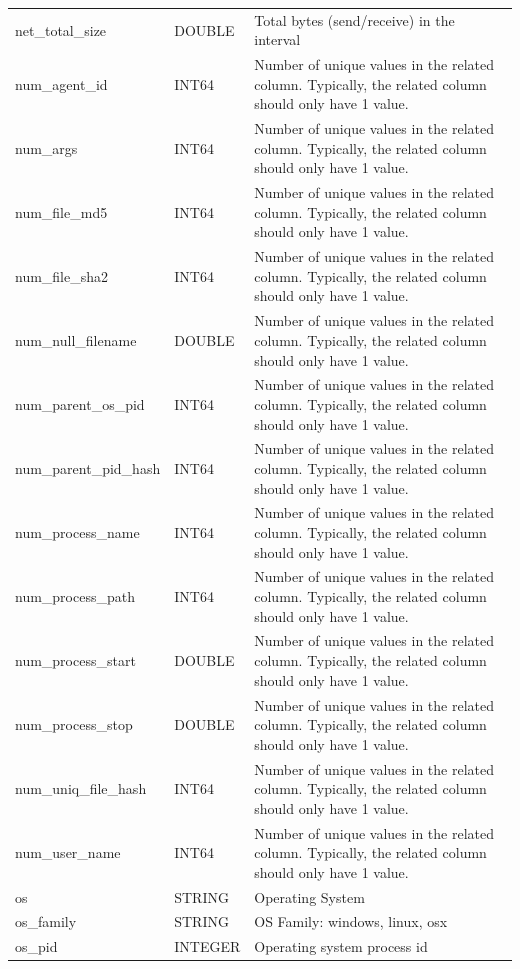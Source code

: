 \documentclass[conference,compsoc]{IEEEtran}
\begin{document}
\begin{longtable}{|p{5cm}|p{2cm}|p{9cm}|}
net\_total\_size & DOUBLE & Total bytes (send/receive) in the interval \\
num\_agent\_id & INT64 & Number of unique values in the related column. Typically, the related column should only have 1 value. \\
num\_args & INT64 & Number of unique values in the related column. Typically, the related column should only have 1 value. \\
num\_file\_md5 & INT64 & Number of unique values in the related column. Typically, the related column should only have 1 value. \\
num\_file\_sha2 & INT64 & Number of unique values in the related column. Typically, the related column should only have 1 value. \\
num\_null\_filename & DOUBLE & Number of unique values in the related column. Typically, the related column should only have 1 value. \\
num\_parent\_os\_pid & INT64 & Number of unique values in the related column. Typically, the related column should only have 1 value. \\
num\_parent\_pid\_hash & INT64 & Number of unique values in the related column. Typically, the related column should only have 1 value. \\
num\_process\_name & INT64 & Number of unique values in the related column. Typically, the related column should only have 1 value. \\
num\_process\_path & INT64 & Number of unique values in the related column. Typically, the related column should only have 1 value. \\
num\_process\_start & DOUBLE & Number of unique values in the related column. Typically, the related column should only have 1 value. \\
num\_process\_stop & DOUBLE & Number of unique values in the related column. Typically, the related column should only have 1 value. \\
num\_uniq\_file\_hash & INT64 & Number of unique values in the related column. Typically, the related column should only have 1 value. \\
num\_user\_name & INT64 & Number of unique values in the related column. Typically, the related column should only have 1 value. \\
os & STRING & Operating System \\
os\_family & STRING & OS Family: windows, linux, osx \\
os\_pid & INTEGER & Operating system process id \\

\end{longtable}
\end{document}
